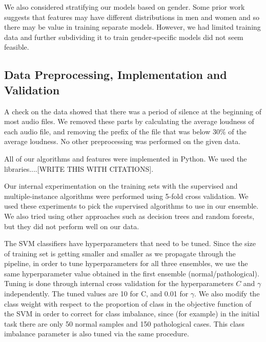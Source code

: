 We also considered stratifying our models based on gender. Some prior work suggests that features may have different distributions in men and women and so there may be value in training separate models. However, we had limited training data and further subdividing it to train gender-specific models did not seem feasible.

\subsection{Data Preprocessing, Implementation and Validation}
A check on the data showed that there was a period of silence at the beginning of most audio files. We removed these parts by calculating the average loudness of each audio file, and removing the prefix of the file that was below  30\% of the average loudness. No other preprocessing was performed on the given data.

All of our algorithms and features were implemented in Python. We used the libraries....[WRITE THIS WITH CITATIONS]. 

Our internal experimentation on the training sets with the supervised and multiple-instance algorithms were performed using 5-fold cross validation. We used these experiments to pick the supervised algorithms to use in our ensemble. We also tried using other approaches such as decision trees and random forests, but they did not perform well on our data.

The SVM classifiers have hyperparameters that need to be tuned. Since the size of training set is getting smaller and smaller as we propagate through the pipeline, in order to tune hyperparameters for all three ensembles, we use the same hyperparameter value obtained in the first ensemble (normal/pathological). Tuning is done through internal cross validation for the hyperparameters $C$ and $\gamma$ independently. The tuned values are 10 for C, and 0.01 for $\gamma$. We also modify the class weight with respect to the proportion of class in the objective function of the SVM in order to correct for class imbalance, since (for example) in the initial task there are only 50 normal samples and 150 pathological cases. This class imbalance parameter is also tuned via the same procedure. 

